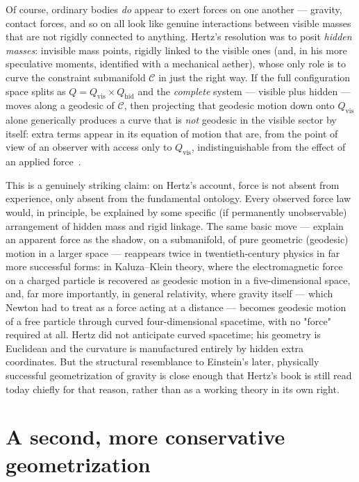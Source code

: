 Of course, ordinary bodies \emph{do} appear to exert forces on one
another --- gravity, contact forces, and so on all look like genuine
interactions between visible masses that are not rigidly connected
to anything. Hertz's resolution was to posit \emph{hidden masses}:
invisible mass points, rigidly linked to the visible ones (and, in
his more speculative moments, identified with a mechanical
aether), whose only role is to curve the constraint submanifold
$\mathcal C$ in just the right way. If the full configuration space
splits as $Q = Q_{\mathrm{vis}}\times Q_{\mathrm{hid}}$ and the
\emph{complete} system --- visible plus hidden --- moves along a
geodesic of $\mathcal C$, then projecting that geodesic motion down
onto $Q_{\mathrm{vis}}$ alone generically produces a curve that is
\emph{not} geodesic in the visible sector by itself: extra terms
appear in its equation of motion that are, from the point of view of
an observer with access only to $Q_{\mathrm{vis}}$, indistinguishable
from the effect of an applied force~\cite{hertz}.

This is a genuinely striking claim: on Hertz's account, force is not
absent from experience, only absent from the fundamental ontology.
Every observed force law would, in principle, be explained by some
specific (if permanently unobservable) arrangement of hidden mass
and rigid linkage. The same basic move --- explain an apparent force
as the shadow, on a submanifold, of pure geometric (geodesic) motion
in a larger space --- reappears twice in twentieth-century physics
in far more successful forms: in Kaluza--Klein theory, where the
electromagnetic force on a charged particle is recovered as geodesic
motion in a five-dimensional space, and, far more importantly, in
general relativity, where gravity itself --- which Newton had to
treat as a force acting at a distance --- becomes geodesic motion of
a free particle through curved four-dimensional spacetime, with no
"force" required at all. Hertz did not anticipate curved spacetime;
his geometry is Euclidean and the curvature is manufactured entirely
by hidden extra coordinates. But the structural resemblance to
Einstein's later, physically successful geometrization of gravity is
close enough that Hertz's book is still read today chiefly for that
reason, rather than as a working theory in its own
right.

\section{A second, more conservative geometrization}

